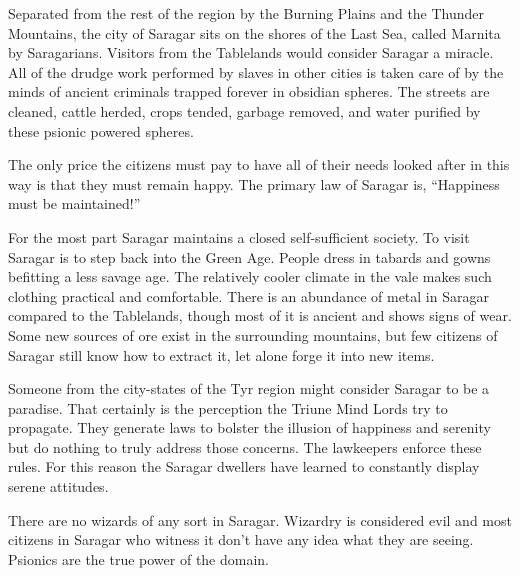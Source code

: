 {	Separated from the rest of the region by the Burning Plains and the Thunder Mountains, the city of Saragar sits on the shores of the Last Sea, called Marnita by Saragarians. Visitors from the Tablelands would consider Saragar a miracle. All of the drudge work performed by slaves in other cities is taken care of by the minds of ancient criminals trapped forever in obsidian spheres. The streets are cleaned, cattle herded, crops tended, garbage removed, and water purified by these psionic powered spheres.

	The only price the citizens must pay to have all of their needs looked after in this way is that they must remain happy. The primary law of Saragar is, ``Happiness must be maintained!''
}
{
	For the most part Saragar maintains a closed self-sufficient society. To visit Saragar is to step back into the Green Age. People dress in tabards and gowns befitting a less savage age. The relatively cooler climate in the vale makes such clothing practical and comfortable. There is an abundance of metal in Saragar compared to the Tablelands, though most of it is ancient and shows signs of wear. Some new sources of ore exist in the surrounding mountains, but few citizens of Saragar still know how to extract it, let alone forge it into new items.

	Someone from the city-states of the Tyr region might consider Saragar to be a paradise. That certainly is the perception the Triune Mind Lords try to propagate. They generate laws to bolster the illusion of happiness and serenity but do nothing to truly address those concerns. The lawkeepers enforce these rules. For this reason the Saragar dwellers have learned to constantly display serene attitudes.

	There are no wizards of any sort in Saragar. Wizardry is considered evil and most citizens in Saragar who witness it don't have any idea what they are seeing. Psionics are the true power of the domain.
}
